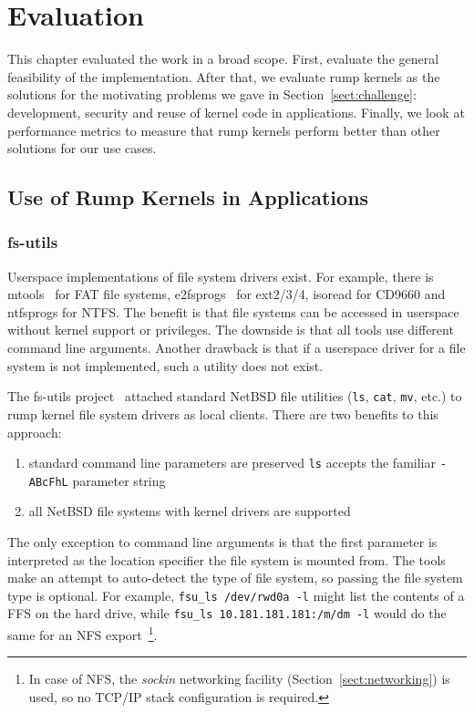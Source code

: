 
\section{Evaluation}
\label{chap:evaluation}

This chapter evaluated the work in a broad scope.  First, evaluate the general
feasibility of the implementation.  After that, we evaluate rump
kernels as the solutions for the motivating problems we gave in
Section~\ref{sect:challenge}: development, security and reuse of
kernel code in applications.  Finally, we look at performance
metrics to measure that rump kernels perform better than other
solutions for our use cases.


\subsection{Use of Rump Kernels in Applications}

\subsubsection{fs-utils}
\label{sect:fs-utils}

Userspace implementations of file system drivers
exist.  For example, there is mtools~\cite{mtools} for FAT
file systems, e2fsprogs~\cite{e2fsprogs} for ext2/3/4, isoread for
CD9660 and ntfsprogs for NTFS.  The benefit is that file systems
can be accessed in userspace without kernel support or privileges.
The downside is that all tools use different command line arguments.
Another drawback is that if a userspace driver for a file system
is not implemented, such a utility does not exist.

The fs-utils project~\cite{ysmal:fs-utils} attached standard NetBSD
file utilities (\texttt{ls}, \texttt{cat}, \texttt{mv}, etc.) to rump
kernel file system drivers as local clients.  There are two benefits
to this approach:

\begin{enumerate}
\item standard command line parameters are preserved \ie \texttt{ls}
accepts the familiar \texttt{-ABcFhL} parameter string

\item all NetBSD file systems with kernel drivers are supported
\end{enumerate}

The only exception to command line arguments is that the first parameter
is interpreted as the location specifier the file system is mounted from.
The tools make an attempt to auto-detect the type of file system, so passing the file system
type is optional.  For example, \verb+fsu_ls /dev/rwd0a -l+ might list
the contents of
a FFS on the hard drive, while \verb+fsu_ls 10.181.181.181:/m/dm -l+
would do the same for an NFS
export~\footnote
{
	In case of NFS, the \textit{sockin} networking facility
	(Section~\ref{sect:networking}) is used, so no TCP/IP stack
	configuration is required.
}.

